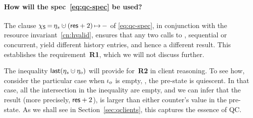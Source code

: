 
%


\paragraph{How will the spec~\eqref{eq:qc-spec} be used?}

The clause $\hists\,{=}\,\gists \hunion (\res+2)\,{\mapsto}\,-$ of
\eqref{eq:qc-spec}, in conjunction with the resource
invariant~\ref{cn:hvalid}, ensures that any two calls to
, sequential or concurrent, yield different history
entries, and hence a different result. This establishes the
requirement~\textbf{R1}, which we will not discuss further.

The inequality $\mathsf{last}(\gists \hunion \gisto)$ will provide
for~\textbf{R2} in client reasoning. To see how, consider the
particular case when $\iota_o$ is empty, \ie, the pre-state is
quiescent. In that case, all the intersection in the inequality are
empty, and we can infer that the result (more precisely, $\mathsf{res} + 2$),
is larger than either counter's value in the pre-state. As we shall
see in Section~\ref{sec:qclients}, this captures the essence of QC.

